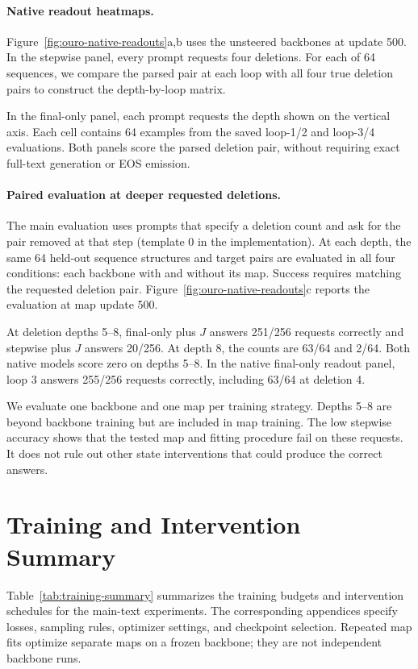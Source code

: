 \documentclass{article}
\begin{document}
\paragraph{Native readout heatmaps.}
Figure~\ref{fig:ouro-native-readouts}a,b uses the unsteered backbones at update 500. In the stepwise panel, every prompt requests four deletions. For each of 64 sequences, we compare the parsed pair at each loop with all four true deletion pairs to construct the depth-by-loop matrix.

In the final-only panel, each prompt requests the depth shown on the vertical axis. Each cell contains 64 examples from the saved loop-1/2 and loop-3/4 evaluations. Both panels score the parsed deletion pair, without requiring exact full-text generation or EOS emission.

\paragraph{Paired evaluation at deeper requested deletions.}
The main evaluation uses prompts that specify a deletion count and ask for the pair removed at that step (template 0 in the implementation). At each depth, the same 64 held-out sequence structures and target pairs are evaluated in all four conditions: each backbone with and without its map. Success requires matching the requested deletion pair. Figure~\ref{fig:ouro-native-readouts}c reports the evaluation at map update 500.

At deletion depths 5--8, final-only plus $J$ answers 251/256 requests correctly and stepwise plus $J$ answers 20/256. At depth 8, the counts are 63/64 and 2/64. Both native models score zero on depths 5--8. In the native final-only readout panel, loop 3 answers 255/256 requests correctly, including 63/64 at deletion 4.

We evaluate one backbone and one map per training strategy. Depths 5--8 are beyond backbone training but are included in map training. The low stepwise accuracy shows that the tested map and fitting procedure fail on these requests. It does not rule out other state interventions that could produce the correct answers.

\FloatBarrier

\section{Training and Intervention Summary}
\label{app:training-summary}
Table~\ref{tab:training-summary} summarizes the training budgets and intervention schedules for the main-text experiments. The corresponding appendices specify losses, sampling rules, optimizer settings, and checkpoint selection. Repeated map fits optimize separate maps on a frozen backbone; they are not independent backbone runs.
\end{document}
